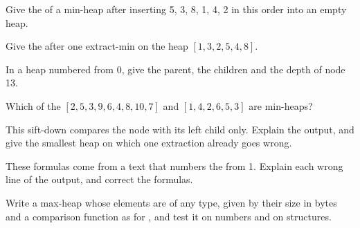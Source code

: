 \begin{exercise}[$\star$]\label{exo:b1:heaps:1}
Give the  of a min-heap after inserting 5, 3, 8, 1, 4, 2 in this order into an empty heap.
\end{exercise}

\begin{exercise}[$\star$]\label{exo:b1:heaps:2}
Give the  after one extract-min on the heap $[1, 3, 2, 5, 4, 8]$.
\end{exercise}

\begin{exercise}[$\star$]\label{exo:b1:heaps:3}
In a heap numbered from 0, give the parent, the children and the depth of node 13.
\end{exercise}

\begin{exercise}[$\star$]\label{exo:b1:heaps:4}
Which of the  $[2, 5, 3, 9, 6, 4, 8, 10, 7]$ and $[1, 4, 2, 6, 5, 3]$ are min-heaps?
\end{exercise}

\begin{exercise}[$\star\star$]\label{exo:b1:heaps:5}
This sift-down compares the node with its left child only. Explain the output, and give the smallest heap on which one
extraction already goes wrong.
\end{exercise}

\begin{exercise}[$\star\star$]\label{exo:b1:heaps:6}
These formulas come from a text that numbers the  from 1. Explain each wrong line of the output, and correct the
formulas.
\end{exercise}

\begin{exercise}[$\star\star$]\label{exo:b1:heaps:7}
Write a max-heap whose elements are of any type, given by their size in bytes and a comparison function as for
, and test it on numbers and on structures.
\end{exercise}

